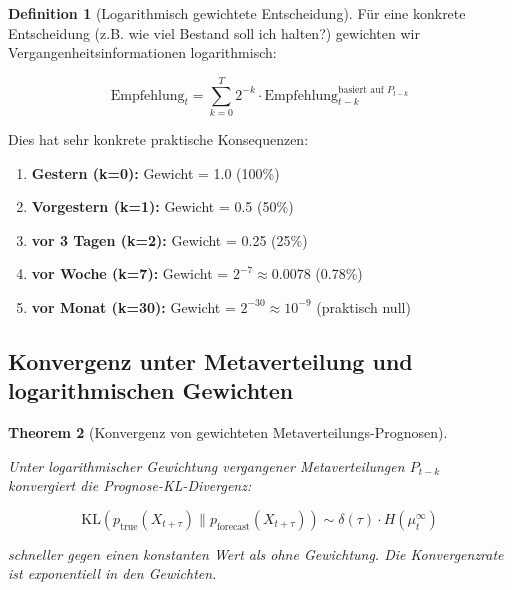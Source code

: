 \documentclass[a4paper, 12pt, twoside, openright]{report}
\newtheorem{theorem}{Theorem}[section]
\theoremstyle{definition}
\newtheorem{definition}[theorem]{Definition}
\theoremstyle{definition}
\newcommand{\KL}{\mathrm{KL}}
\begin{document}
\begin{definition}[Logarithmisch gewichtete Entscheidung]
Für eine konkrete Entscheidung (z.B. wie viel Bestand soll ich halten?) gewichten wir Vergangenheitsinformationen logarithmisch:

\begin{equation}
\text{Empfehlung}_t = \sum_{k=0}^{T} 2^{-k} \cdot \text{Empfehlung}_{t-k}^{\text{basiert auf } P_{t-k}}
\label{eq:adaptive_decision}
\end{equation}

\end{definition}

Dies hat sehr konkrete praktische Konsequenzen:

\begin{enumerate}
  \item \textbf{Gestern (k=0):} Gewicht = 1.0 (100\%)
  \item \textbf{Vorgestern (k=1):} Gewicht = 0.5 (50\%)
  \item \textbf{vor 3 Tagen (k=2):} Gewicht = 0.25 (25\%)
  \item \textbf{vor Woche (k=7):} Gewicht = $2^{-7} \approx 0.0078$ (0.78\%)
  \item \textbf{vor Monat (k=30):} Gewicht = $2^{-30} \approx 10^{-9}$ (praktisch null)
\end{enumerate}

\subsection{Konvergenz unter Metaverteilung und logarithmischen Gewichten}

\begin{theorem}[Konvergenz von gewichteten Metaverteilungs-Prognosen]
\label{thm:convergence_meta_weighted}

Unter logarithmischer Gewichtung vergangener Metaverteilungen $P_{t-k}$ konvergiert die Prognose-KL-Divergenz:

\begin{equation}
\KL(p_{\text{true}}(X_{t+\tau}) \parallel p_{\text{forecast}}(X_{t+\tau})) \sim \delta(\tau) \cdot H(\mu_t^{\infty})
\label{eq:convergence_rate}
\end{equation}

schneller gegen einen konstanten Wert als ohne Gewichtung. Die Konvergenzrate ist exponentiell in den Gewichten.
\end{theorem}
\end{document}
